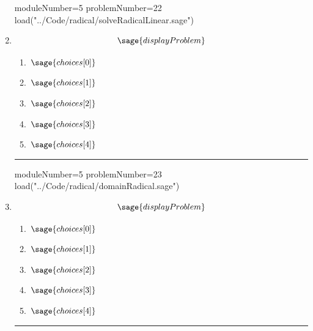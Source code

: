 \documentclass[14pt]{article}
\newcommand{\litem}[1]{\item#1\hspace*{-1cm}\rule{\textwidth}{0.4pt}}
\begin{document}
\begin{enumerate}
{\begin{enumerate}[label=\Alph*.]
\end{enumerate}
}

\begin{sagesilent}
moduleNumber=5
problemNumber=22
load("../Code/radical/solveRadicalLinear.sage")
\end{sagesilent}

\litem{

\[ \sage{displayProblem} \]

	\begin{enumerate}[label=\Alph*.]
		\item \( \sage{choices[0]} \)
		\item \( \sage{choices[1]} \)
		\item \( \sage{choices[2]} \)
		\item \( \sage{choices[3]} \)
		\item \( \sage{choices[4]} \)
	\end{enumerate}
}

\begin{sagesilent}
moduleNumber=5
problemNumber=23
load("../Code/radical/domainRadical.sage")
\end{sagesilent}

\litem{ 

	\[ \sage{displayProblem} \]
	\begin{enumerate}[label=\Alph*.]
		\item \( \sage{choices[0]} \)
		\item \( \sage{choices[1]} \)
		\item \( \sage{choices[2]} \)
		\item \( \sage{choices[3]} \)
		\item \( \sage{choices[4]} \)
	\end{enumerate}
}


\end{enumerate}
\end{document}
